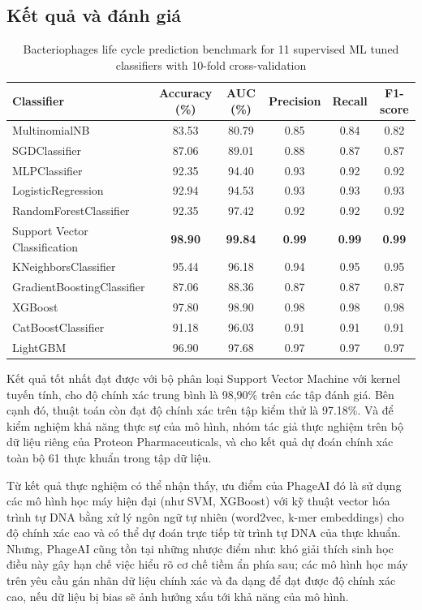 \subsection*{Kết quả và đánh giá}
\begin{table}[ht]
\footnotesize
\centering
\caption{Bacteriophages life cycle prediction benchmark for 11 supervised ML tuned classifiers with 10-fold cross-validation}
\begin{tabular}{lccccc}
\toprule
\textbf{Classifier} & \textbf{Accuracy (\%)} & \textbf{AUC (\%)} & \textbf{Precision} & \textbf{Recall} & \textbf{F1-score} \\
\midrule
MultinomialNB          & 83.53 & 80.79 & 0.85 & 0.84 & 0.82 \\
SGDClassifier          & 87.06 & 89.01 & 0.88 & 0.87 & 0.87 \\
MLPClassifier          & 92.35 & 94.40 & 0.93 & 0.92 & 0.92 \\
LogisticRegression     & 92.94 & 94.53 & 0.93 & 0.93 & 0.93 \\
RandomForestClassifier & 92.35 & 97.42 & 0.92 & 0.92 & 0.92 \\
Support Vector Classification & \textbf{98.90} & \textbf{99.84} & \textbf{0.99} & \textbf{0.99} & \textbf{0.99} \\
KNeighborsClassifier          & 95.44 & 96.18 & 0.94 & 0.95 & 0.95 \\
GradientBoostingClassifier   & 87.06 & 88.36 & 0.87 & 0.87 & 0.87 \\
XGBoost                       & 97.80 & 98.90 & 0.98 & 0.98 & 0.98 \\
CatBoostClassifier           & 91.18 & 96.03 & 0.91 & 0.91 & 0.91 \\
LightGBM                      & 96.90 & 97.68 & 0.97 & 0.97 & 0.97 \\
\bottomrule
\end{tabular}
\end{table}

Kết quả tốt nhất đạt được với bộ phân loại Support Vector Machine với kernel tuyến tính, cho độ chính xác trung bình là 98,90\% trên các tập đánh giá. Bên cạnh đó, thuật toán còn đạt độ chính xác trên tập kiểm thử là 97.18\%. Và để kiểm nghiệm khả năng thực sự của mô hình, nhóm tác giả thực nghiệm trên bộ dữ liệu riêng của Proteon Pharmaceuticals, và cho kết quả dự đoán chính xác toàn bộ 61 thực khuẩn trong tập dữ liệu.

Từ kết quả thực nghiệm có thể nhận thấy, ưu điểm của PhageAI đó là sử dụng các mô hình học máy hiện đại (như SVM, XGBoost) với kỹ thuật vector hóa trình tự DNA bằng xử lý ngôn ngữ tự nhiên (word2vec, k-mer embeddings) cho độ chính xác cao và có thể dự đoán trực tiếp từ trình tự DNA của thực khuẩn. Nhưng, PhageAI cũng tồn tại những nhược điểm như: khó giải thích sinh học điều này gây hạn chế việc hiểu rõ cơ chế tiềm ẩn phía sau; các mô hình học máy trên yêu cầu gán nhãn dữ liệu chính xác và đa dạng để đạt được độ chính xác cao, nếu dữ liệu bị bias sẽ ảnh hưởng xấu tới khả năng của mô hình. 
